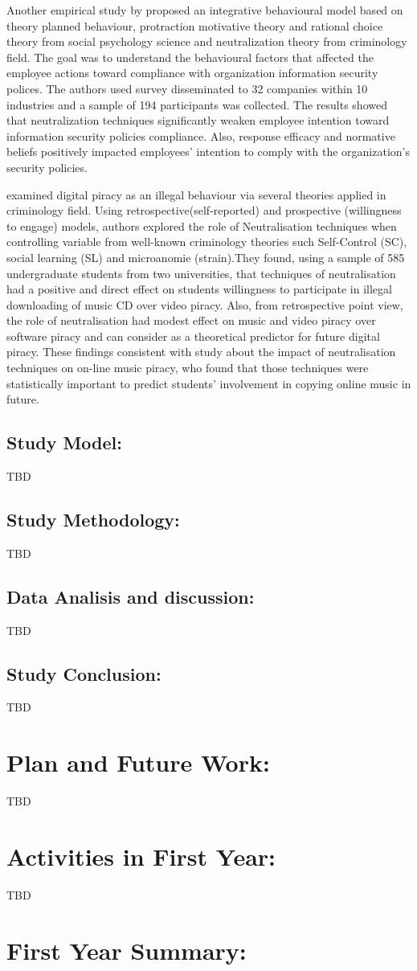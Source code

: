Another empirical study by\citet{Kim2014} proposed an integrative behavioural model based on theory planned behaviour, protraction motivative theory and rational choice theory from social psychology science and neutralization theory from criminology field. The goal was to understand the behavioural factors that affected the employee actions toward compliance with organization information security polices. The authors used survey disseminated to 32 companies within 10 industries and a sample of 194 participants was collected. The results showed that neutralization techniques significantly weaken employee intention toward information security policies compliance. Also, response efficacy and normative beliefs positively impacted employees' intention to comply with the organization's security policies.

\citet{Morris} examined digital piracy as an illegal behaviour via several theories applied in criminology field. Using retrospective(self-reported) and prospective (willingness to engage) models, authors explored the role of Neutralisation techniques when controlling variable from  well-known criminology theories such Self-Control (SC), social learning (SL) and microanomie (strain).They found, using a sample of 585 undergraduate students from two universities, that techniques of neutralisation had a positive and direct effect on students willingness to participate in illegal downloading of music CD over video piracy. Also, from retrospective point view, the role of neutralisation had modest effect on music and video piracy over software piracy and can consider as a theoretical predictor for future digital piracy. These findings consistent with \cite {Ingram2008} study about the impact of neutralisation techniques on on-line music piracy, who found that those techniques were statistically important to predict students' involvement in copying online music in future.       
 
\subsection{Study Model:}
TBD
\subsection{Study Methodology:}
TBD
\subsection{Data Analisis and discussion:}
TBD
\subsection{Study Conclusion:}
TBD

\section{Plan and Future Work:}
TBD

\section{Activities in First Year:}
TBD


\section{First Year Summary:}
